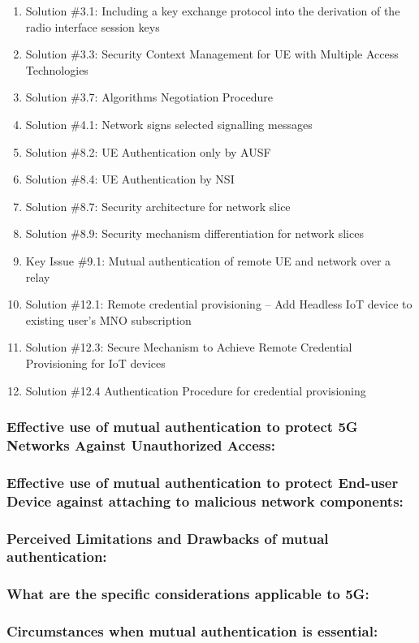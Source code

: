 \documentclass[lnicst,sechang,a4paper]{svmultln}
\begin{document}
\begin{enumerate}
\item Solution \#3.1: Including a key exchange protocol into the derivation of the radio interface session keys
\item Solution \#3.3: Security Context Management for UE with Multiple Access Technologies
\item Solution \#3.7: Algorithms Negotiation Procedure
\item Solution \#4.1: Network signs selected signalling messages
\item Solution \#8.2: UE Authentication only by AUSF
\item Solution \#8.4: UE Authentication by NSI
\item Solution \#8.7: Security architecture for network slice
\item Solution \#8.9: Security mechanism differentiation for network slices
\item Key Issue \#9.1: Mutual authentication of remote UE and network over a relay
\item Solution \#12.1: Remote credential provisioning – Add Headless IoT device to existing user’s MNO subscription
\item Solution \#12.3: Secure Mechanism to Achieve Remote Credential Provisioning for IoT devices
\item Solution \#12.4 Authentication Procedure for credential provisioning

\end{enumerate}


\subsubsection{Effective use of mutual authentication to protect 5G Networks Against Unauthorized Access:}
\subsubsection{Effective use of mutual authentication to protect End-user Device against attaching to malicious network components:}
\subsubsection{Perceived Limitations and Drawbacks of mutual authentication:}
\subsubsection{What are the specific considerations applicable to 5G:}
\subsubsection{Circumstances when mutual authentication is essential:}
\end{document}
